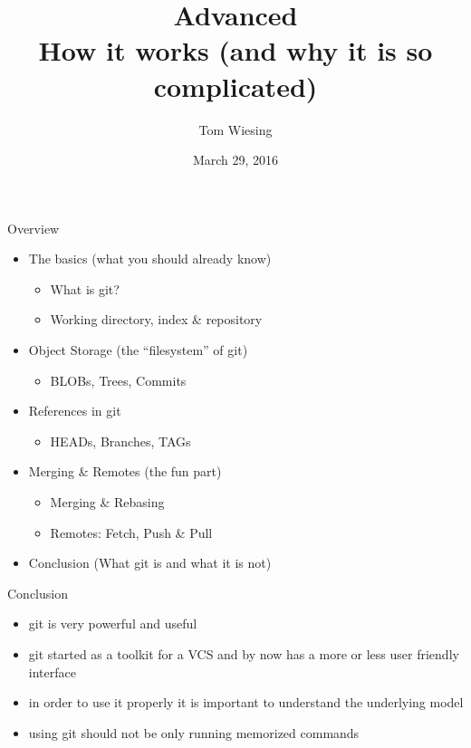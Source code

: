 \documentclass{beamer}
\title{Advanced \logoimage{imgs/git_logo}{40px}\\How it works (and why it is so complicated)}
\author{Tom Wiesing}
\institute{KWARC second hour talk}
\date{March 29, 2016}
\begin{document}
    \frame{\titlepage}
    
    \begin{frame}{Overview}
      \begin{itemize}
        \item The basics (what you should already know)
        \begin{itemize}
          \item What is git?
          \item Working directory, index \& repository
        \end{itemize}
          
          \item Object Storage (the ``filesystem'' of git)
          \begin{itemize}
            \item BLOBs, Trees, Commits
          \end{itemize}
          
          \item References in git
          \begin{itemize}
            \item HEADs, Branches, TAGs
          \end{itemize}
                   
          \item Merging \& Remotes (the fun part)
          \begin{itemize}
            \item Merging \& Rebasing
            \item Remotes: Fetch, Push \& Pull
          \end{itemize}
          
          \item Conclusion (What git is and what it is not)
      \end{itemize}
    \end{frame}
    
    
    
    
    
    
    \begin{frame}{Conclusion}
      \begin{itemize}
        \item git is very powerful and useful
        \item git started as a toolkit for a VCS and by now has a more or less user friendly interface
        \item in order to use it properly it is important to understand the underlying model
        \item using git should not be only running memorized commands
      \end{itemize}
    \end{frame}
    
\end{document}
